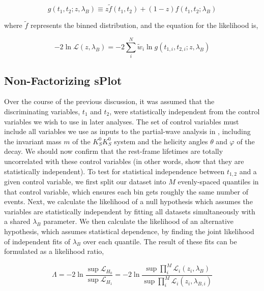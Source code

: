 \begin{equation}
  g(t_1, t_2; z, \lambda_B) \equiv z \tilde{f}(t_1, t_2) + (1-z) f(t_1, t_2; \lambda_B)
  \label{eq:splot-mixture}
\end{equation}

where $\tilde{f}$ represents the binned distribution, and the equation for the likelihood is,

\begin{equation}
  -2\ln\mathcal{L}(z,  \lambda_B) = -2\sum_i^N \tilde{w}_i \ln g(t_{1,i}, t_{2,i}; z, \lambda_B)
  \label{eq:splot-nll}
\end{equation}

\subsection{Non-Factorizing sPlot}\label{sec:non-factorizing-splot}

Over the course of the previous discussion, it was assumed that the discriminating variables, $t_1$ and $t_2$, were statistically independent from the control variables we wish to use in later analyses. The set of control variables must include all variables we use as inputs to the partial-wave analysis in , including the invariant mass $m$ of the $K_S^0K_S^0$ system and the helicity angles $\theta$ and $\varphi$ of the decay. We should now confirm that the rest-frame lifetimes are totally uncorrelated with these control variables (in other words, show that they are statistically independent). To test for statistical independence between $t_{1,2}$ and a given control variable, we first split our dataset into $M$ evenly-spaced quantiles in that control variable, which ensures each bin gets roughly the same number of events. Next, we calculate the likelihood of a null hypothesis which assumes the variables are statistically independent by fitting all datasets simultaneously with a shared $\lambda_B$ parameter. We then calculate the likelihood of an alternative hypothesis, which assumes statistical dependence, by finding the joint likelihood of independent fits of $\lambda_B$ over each quantile. The result of these fits can be formulated as a likelihood ratio,

\begin{equation}
  \Lambda = -2\ln\frac{\sup \mathcal{L}_{H_0}}{\sup \mathcal{L}_{H_1}} = -2\ln\frac{\sup \prod_i^M \mathcal{L}_i(z_i, \lambda_B)}{\sup \prod_i^M \mathcal{L}_i(z_i, \lambda_{B,i})}
  \label{eq:independence-test}
\end{equation}


